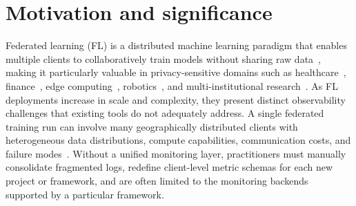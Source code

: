 \documentclass[preprint,12pt, a4paper]{elsarticle}
\newcommand{\rev}[1]{{\color{blue}#1}}
\newcommand{\rev}[1]{#1}
\newcommand{\zl}[1]{{\textcolor{blue}{Check: #1}}}
\newcommand{\ab}[2]{{\textcolor{green}{Check: #1}}}
\begin{document}


\clearpage


\section{Motivation and significance}
\label{sec:motivation}
Federated learning (FL) is a distributed machine learning paradigm that enables multiple clients to collaboratively train models without sharing raw data~\rev{\cite{mcmahan2017communication,zaland2025guarding}}, making it particularly valuable in privacy-sensitive domains such as healthcare~\cite{rieke2020future,hoang2025enabling}, finance~\cite{wang2019measure,wang2019interpret}, edge computing~\rev{\cite{lim2020federated,devaraj2024ruralai,que2025scalable}}\rev{, robotics~\cite{zaland2025federated}}, and multi-institutional research~\cite{kairouz2021advances,li2026scalable}. As FL deployments increase in scale and complexity, they present distinct {observability} challenges that existing tools do not adequately address. A single federated training run can involve many geographically distributed clients with heterogeneous data distributions, compute capabilities, communication costs, and failure modes~\rev{\cite{li2020federated,chen2024adaptive,chen2024robust}}. Without a unified monitoring layer, practitioners must manually consolidate fragmented logs, redefine client-level metric schemas for each new project \rev{ or framework, and are often limited to the monitoring backends supported by a particular framework}.
\end{document}

